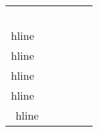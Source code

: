 \begin{table}[h!]
\scriptsize
	\begin{tabulary}{\textwidth}{|C|C|C|C|C|}
	\  &  &  &  &  \\hline
	\  &  &  &  &  \\hline
	\  &  &  &  &  \\hline
	\  &  &  &  &  \\hline
	\  &  &  &  &  \\hline
	\end{tabulary}
\caption{\label{tab:} }
\end{table}

%	



